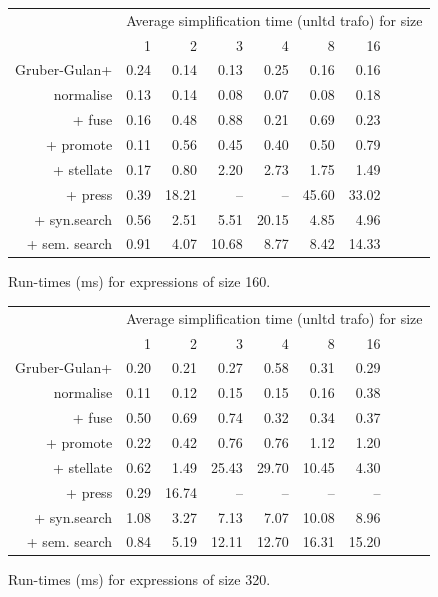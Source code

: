 \begin{figure}\begin{tabular}{rrrrrrrrrr}
 & \multicolumn{9}{c}{Average simplification time (unltd trafo) for size} \\
 & 1 & 2 & 3 & 4 & 8 & 16 \\
Gruber-Gulan+ & 0.24 & 0.14 & 0.13 & 0.25 & 0.16 & 0.16 \\
normalise & 0.13 & 0.14 & 0.08 & 0.07 & 0.08 & 0.18 \\
+ fuse & 0.16 & 0.48 & 0.88 & 0.21 & 0.69 & 0.23 \\
+ promote & 0.11 & 0.56 & 0.45 & 0.40 & 0.50 & 0.79 \\
+ stellate & 0.17 & 0.80 & 2.20 & 2.73 & 1.75 & 1.49 \\
+ press & 0.39 & 18.21 & -- & -- & 45.60 & 33.02 \\
+ syn.search & 0.56 & 2.51 & 5.51 & 20.15 & 4.85 & 4.96 \\
+ sem. search & 0.91 & 4.07 & 10.68 & 8.77 & 8.42 & 14.33 \\
\end{tabular}\caption{Run-times (ms) for expressions of size 160.}\end{figure}
\begin{figure}\begin{tabular}{rrrrrrrrrr}
 & \multicolumn{9}{c}{Average simplification time (unltd trafo) for size} \\
 & 1 & 2 & 3 & 4 & 8 & 16 \\
Gruber-Gulan+ & 0.20 & 0.21 & 0.27 & 0.58 & 0.31 & 0.29 \\
normalise & 0.11 & 0.12 & 0.15 & 0.15 & 0.16 & 0.38 \\
+ fuse & 0.50 & 0.69 & 0.74 & 0.32 & 0.34 & 0.37 \\
+ promote & 0.22 & 0.42 & 0.76 & 0.76 & 1.12 & 1.20 \\
+ stellate & 0.62 & 1.49 & 25.43 & 29.70 & 10.45 & 4.30 \\
+ press & 0.29 & 16.74 & -- & -- & -- & -- \\
+ syn.search & 1.08 & 3.27 & 7.13 & 7.07 & 10.08 & 8.96 \\
+ sem. search & 0.84 & 5.19 & 12.11 & 12.70 & 16.31 & 15.20 \\
\end{tabular}\caption{Run-times (ms) for expressions of size 320.}\end{figure}
